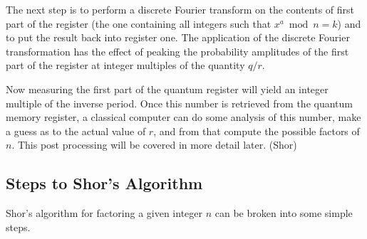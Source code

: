 \documentclass[]{article}
\begin{document}
The next step is to perform a discrete Fourier transform on the
contents of first part of the register (the one containing all
integers such that $x^{a} \bmod n = k$) and to put the result back
into register one. The application of the discrete Fourier
transformation has the effect of peaking the probability amplitudes of
the first part of the register at integer multiples of the quantity $q
/ r$.

Now measuring the first part of the quantum register will yield an
integer multiple of the inverse period. Once this number is retrieved
from the quantum memory register, a classical computer can do some
analysis of this number, make a guess as to the actual value of $r$,
and from that compute the possible factors of $n$. This post
processing will be covered in more detail later. (Shor)

\subsection{Steps to Shor's Algorithm}

Shor's algorithm for factoring a given integer $n$ can be broken into
some simple steps.
\end{document}
